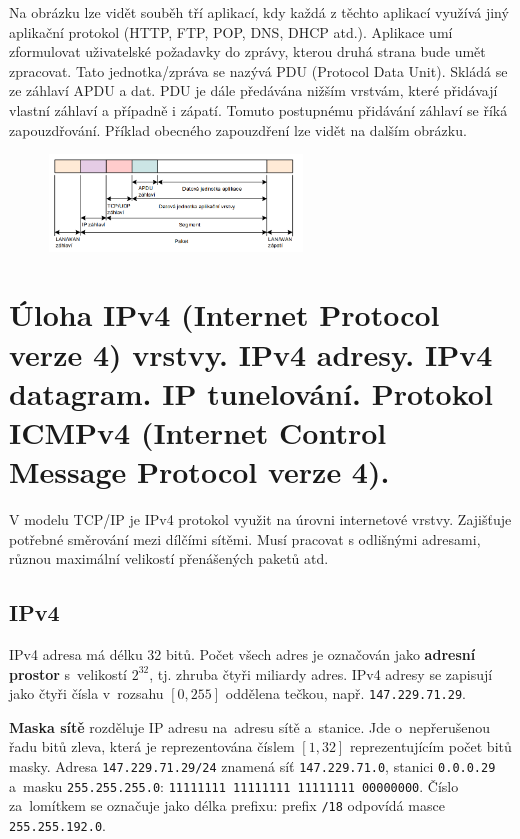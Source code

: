 Na obrázku lze vidět souběh tří aplikací, kdy každá z těchto aplikací využívá jiný aplikační protokol (HTTP, FTP, POP, DNS, DHCP atd.).
Aplikace umí zformulovat uživatelské požadavky do zprávy, kterou druhá strana bude umět zpracovat.
Tato jednotka/zpráva se nazývá PDU (Protocol Data Unit).
Skládá se ze záhlaví APDU a dat.
PDU je dále předávána nižším vrstvám, které přidávají vlastní záhlaví a případně i zápatí.
Tomuto postupnému přidávání záhlaví se říká zapouzdřování.
Příklad obecného zapouzdření lze vidět na dalším obrázku.

\begin{figure}[!h]
    \centering
    \includegraphics[width=0.6\textwidth]{obrazky/013.png}
\end{figure}


\clearpage
\section{Úloha IPv4 (Internet Protocol verze 4) vrstvy. IPv4 adresy. IPv4 datagram. IP tunelování. Protokol ICMPv4 (Internet Control Message Protocol verze 4).}

V modelu TCP/IP je IPv4 protokol využit na úrovni internetové vrstvy.
Zajišťuje potřebné směrování mezi dílčími sítěmi.
Musí pracovat s odlišnými adresami, různou maximální velikostí přenášených paketů atd.

\subsection{IPv4}

IPv4 adresa má délku 32 bitů.
Počet všech adres je označován jako \textbf{adresní prostor} s~velikostí $2^{32}$, tj. zhruba čtyři miliardy adres.
IPv4 adresy se zapisují jako čtyři čísla v~rozsahu $[0, 255]$ oddělena tečkou, např. \texttt{147.229.71.29}.

\textbf{Maska sítě} rozděluje IP adresu na~adresu sítě a~stanice.
Jde o~nepřerušenou řadu bitů zleva, která je reprezentována číslem $[1, 32]$ reprezentujícím počet bitů masky.
Adresa \texttt{147.229.71.29/24} znamená síť \texttt{147.229.71.0}, stanici \texttt{0.0.0.29} a~masku \texttt{255.255.255.0}: \texttt{11111111 11111111 11111111 00000000}.
Číslo za~lomítkem se označuje jako délka prefixu: prefix \texttt{/18} odpovídá masce \texttt{255.255.192.0}.

